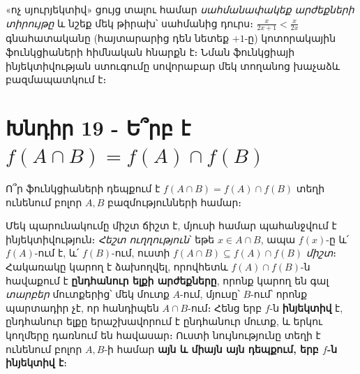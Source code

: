\documentclass[11pt,a4paper]{article}
\begin{document}
\begin{center}
\end{center}

\begin{methodbox}
«ոչ սյուրյեկտիվ» ցույց տալու համար \emph{սահմանափակեք արժեքների տիրույթը} և
նշեք մեկ թիրախ՝ սահմանից դուրս։ $\tfrac{x}{2x+1}<\tfrac{x}{2x}$ գնահատականը (հայտարարից դեն նետեք
$+1$-ը) կոտորակային ֆունկցիաների հիմնական հնարքն է։ Նման ֆունկցիայի ինյեկտիվության ստուգումը
սովորաբար մեկ տողանոց խաչաձև բազմապատկում է։
\end{methodbox}

\section*{Խնդիր 19 - Ե՞րբ է $f(A\cap B)=f(A)\cap f(B)$}

\begin{problembox}[19]
Ո՞ր ֆունկցիաների դեպքում է $f(A\cap B)=f(A)\cap f(B)$ տեղի ունենում բոլոր $A,B$ բազմությունների համար։
\end{problembox}

\begin{ideabox}
Մեկ պարունակումը միշտ ճիշտ է, մյուսի համար պահանջվում է ինյեկտիվություն։ \emph{Հեշտ ուղղություն}՝ եթե $x\in A\cap B$, ապա
$f(x)$-ը և՛ $f(A)$-ում է, և՛ $f(B)$-ում, ուստի $f(A\cap B)\subseteq f(A)\cap f(B)$ \emph{միշտ}։
Հակառակը կարող է ձախողվել, որովհետև $f(A)\cap f(B)$-ն հավաքում է \textbf{ընդհանուր ելքի արժեքները},
որոնք կարող են գալ \emph{տարբեր} մուտքերից՝ մեկ մուտք $A$-ում, մյուսը՝ $B$-ում՝ որոնք պարտադիր չէ, որ
հանդիպեն $A\cap B$-ում։ Հենց երբ $f$-ն \textbf{ինյեկտիվ} է, ընդհանուր ելքը երաշխավորում է ընդհանուր
մուտք, և երկու կողմերը դառնում են հավասար։ Ուստի նույնությունը տեղի է ունենում բոլոր $A,B$-ի համար
\textbf{այն և միայն այն դեպքում, երբ $f$-ն ինյեկտիվ է}։
\end{ideabox}
\end{document}
